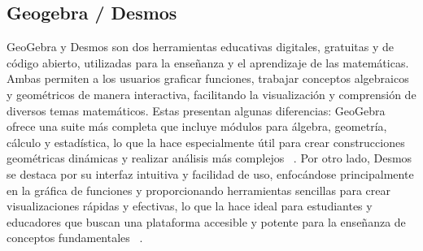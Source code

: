 \subsection{Geogebra / Desmos}
GeoGebra y Desmos son dos herramientas educativas digitales, gratuitas y de código abierto, utilizadas para la enseñanza y el aprendizaje de las matemáticas. Ambas permiten a los usuarios graficar funciones, trabajar conceptos algebraicos y geométricos de manera interactiva, facilitando la visualización y comprensión de diversos temas matemáticos. Estas presentan algunas diferencias: GeoGebra ofrece una suite más completa que incluye módulos para álgebra, geometría, cálculo y estadística, lo que la hace especialmente útil para crear construcciones geométricas dinámicas y realizar análisis más complejos ~\cite{GeoGebra2024}. Por otro lado, Desmos se destaca por su interfaz intuitiva y facilidad de uso, enfocándose principalmente en la gráfica de funciones y proporcionando herramientas sencillas para crear visualizaciones rápidas y efectivas, lo que la hace ideal para estudiantes y educadores que buscan una plataforma accesible y potente para la enseñanza de conceptos fundamentales ~\cite{Desmos2024}.


